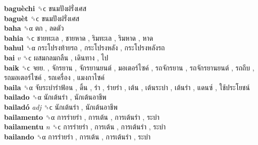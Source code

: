 \textbf{baguèchi} ␝ϲ   ขนมปังฝรั่งเศส   \\
\textbf{baguèt} ␝ϲ   ขนมปังฝรั่งเศส   \\
\textbf{baha} ␝α   ตก ,  ลดตัว   \\
\textbf{bahia} ␝ϲ   ชายทะเล ,  ชายหาด ,  ริมทะเล ,  ริมหาด ,  หาด   \\
\textbf{bahul} ␝α   กระโปรงท้ายรถ ,  กระโปรงหลัง ,  กระโปรงหลังรถ   \\
\textbf{bai} \emph{v}  ␝ϲ   ผสมกลมกลืน ,  เดินทาง ,  ไป   \\
\textbf{baik} ␝ϲ   จยย. ,  จักรยาน ,  จักรยานยนต์ ,  มอเตอร์ไซค์ ,  รถจักรยาน ,  รถจักรยานยนต์ ,  รถถีบ ,  รถมอเตอร์ไซค์ ,  รถเครื่อง ,  แมงกาไซค์   \\
\textbf{baila} ␝α   จับระบำรำฟ้อน ,  ดิ้น ,  รำ ,  ร่ายรำ ,  เต้น ,  เต้นระบำ ,  เต้นรำ ,  แดนซ์ ,  ใช้ประโยชน์   \\
\textbf{bailado} ␝α   นักเต้นรำ ,  นักเต้นอาชีพ   \\
\textbf{bailadó} \emph{adj}  ␝ϲ   นักเต้นรำ ,  นักเต้นอาชีพ   \\
\textbf{bailamento} ␝α   การร่ายรำ ,  การเต้น ,  การเต้นรำ ,  ระบำ   \\
\textbf{bailamentu} \emph{n}  ␝ϲ   การร่ายรำ ,  การเต้น ,  การเต้นรำ ,  ระบำ   \\
\textbf{bailando} ␝α   การร่ายรำ ,  การเต้น ,  การเต้นรำ ,  ระบำ   \\
